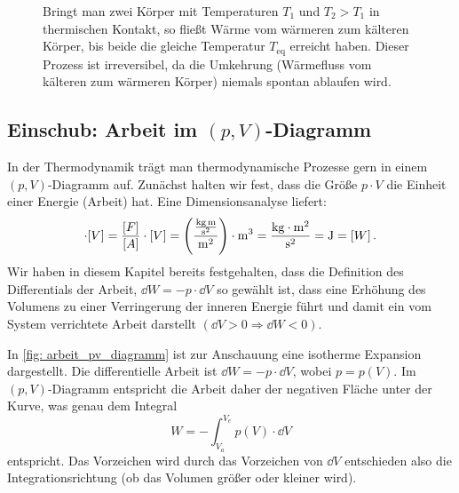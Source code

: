 \begin{figure}[htb]
{%
    }
    \caption{Bringt man zwei Körper mit Temperaturen $T_1$ und $T_2 > T_1$ in thermischen Kontakt, so fließt Wärme vom wärmeren zum kälteren Körper, bis beide die gleiche Temperatur $T_{\text{eq}}$ erreicht haben. Dieser Prozess ist irreversibel, da die Umkehrung (Wärmefluss vom kälteren zum wärmeren Körper) niemals spontan ablaufen wird.}\label{fig: beispiel_irreversibler_prozess}
\end{figure}

\subsection{Einschub: Arbeit im $(p,V)$-Diagramm}\label{subsec: arbeit_pV_diagramm_erklaerung}
In der Thermodynamik trägt man thermodynamische Prozesse gern in einem $(p,V)$-Diagramm auf. Zunächst halten wir fest, dass die Größe $p \cdot V$ die Einheit einer Energie (Arbeit) hat. Eine Dimensionsanalyse liefert: 
\begin{equation}
    [p] \cdot [V] = \frac{[F]}{[A]} \cdot [V] = \left( \frac{\frac{\si{\kilo\gram \meter}}{\si{\second}^2}}{\si{\meter}^2} \right) \cdot \si{\meter}^3 = \frac{\si{\kilo\gram} \cdot \si{\meter}^2}{\si{\second}^2} = \si{\joule} = [W] \mDot 
\end{equation}
Wir haben in diesem Kapitel bereits festgehalten, dass die Definition des Differentials der Arbeit, $\dd W = -p\cdot \dd V$ so gewählt ist, dass eine Erhöhung des Volumens zu einer Verringerung der inneren Energie führt und damit ein vom System verrichtete Arbeit darstellt $(\dd V > 0 \Rightarrow \dd W < 0)$.

In \cref{fig: arbeit_pv_diagramm} ist zur Anschauung eine isotherme Expansion dargestellt. Die differentielle Arbeit ist $\dd W = -p \cdot \dd V$, wobei $p=p(V)$. Im $(p,V)$-Diagramm entspricht die Arbeit daher der negativen Fläche unter der Kurve, was genau dem Integral 
\begin{equation}
    W = -\int_{V_a}^{V_e} p(V) \cdot \dd V
\end{equation}
entspricht. Das Vorzeichen wird durch das Vorzeichen von $\dd V$ entschieden also die Integrationsrichtung (ob das Volumen größer oder kleiner wird).

